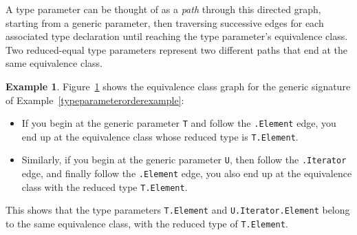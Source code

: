 \documentclass[a4paper,headsepline,bibliography=totoc,toc=flat,fleqn,twoside=semi]{scrbook}
\theoremstyle{definition}
\theoremstyle{definition}
\newtheorem{example}{Example}[chapter]
\theoremstyle{definition}
\begin{document}
A type parameter can be thought of as a \emph{path} through this directed graph, starting from a generic parameter, then traversing successive edges for each associated type declaration until reaching the type parameter's equivalence class. Two reduced-equal type parameters represent two different paths that end at the same equivalence class.

\begin{figure}\label{archetypegraph}
\begin{center}
\end{center}
\end{figure}

\begin{example}
Figure~\ref{archetypegraph} shows the equivalence class graph for the generic signature of Example~\ref{typeparameterorderexample}:
\begin{itemize}
\item If you begin at the generic parameter \texttt{T} and follow the \texttt{.Element} edge, you end up at the equivalence class whose reduced type is \texttt{T.Element}.
\item Similarly, if you begin at the generic parameter \texttt{U}, then follow the \texttt{.Iterator} edge, and finally follow the \texttt{.Element} edge, you also end up at the equivalence class with the reduced type \texttt{T.Element}.
\end{itemize}
This shows that the type parameters \texttt{T.Element} and \texttt{U.Iterator.Element} belong to the same equivalence class, with the reduced type of \texttt{T.Element}.
\end{example}
\end{document}

